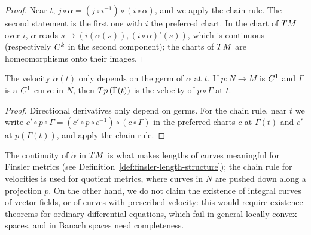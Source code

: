\begin{proof}
  \leanok
  Near $t$, $j \circ \alpha = (j \circ i^{-1}) \circ (i \circ \alpha)$, and we apply the chain
  rule. The second statement is the first one with $i$ the preferred chart. In the chart of
  $T M$ over $i$, $\dot\alpha$ reads $s \mapsto (i(\alpha(s)), (i \circ \alpha)'(s))$, which is
  continuous (respectively $C^{k}$ in the second component); the charts of $T M$ are
  homeomorphisms onto their images.
\end{proof}

\begin{proposition}
  \label{prop:man-velocity-chain}
  \leanok
  The velocity $\dot\alpha(t)$ only depends on the germ of $\alpha$ at $t$. If $p \colon N \to
  M$ is $C^{1}$ and $\Gamma$ is a $C^{1}$ curve in $N$, then $T p\,(\dot\Gamma(t))$ is the velocity of $p \circ \Gamma$
  at $t$.
\end{proposition}

\begin{proof}
  \leanok
  Directional derivatives only depend on germs. For the chain rule, near $t$ we write
  $c' \circ p \circ \Gamma = (c' \circ p \circ c^{-1}) \circ (c \circ \Gamma)$ in the preferred
  charts $c$ at $\Gamma(t)$ and $c'$ at $p(\Gamma(t))$, and apply the chain rule.
\end{proof}

\begin{remark}
  \label{rem:man-curves-ode}
  The continuity of $\dot\alpha$ in $T M$ is what makes lengths of curves meaningful for Finsler
  metrics (see Definition~\ref{def:finsler-length-structure}); the chain rule for velocities is used for quotient
  metrics, where curves in $N$ are pushed down along a projection $p$. On the other hand, we do
  not claim the existence of integral curves of vector fields, or of curves with prescribed
  velocity: this would require existence theorems for ordinary differential equations, which
  fail in general locally convex spaces, and in Banach spaces need completeness.
\end{remark}
